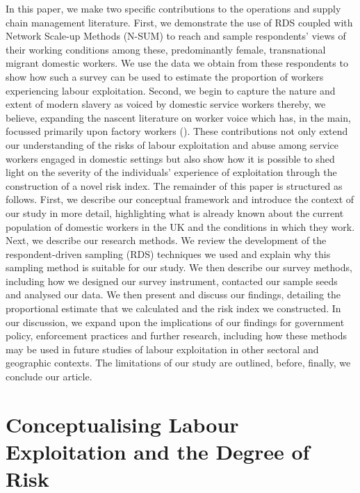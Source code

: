 \documentclass[
  12pt,
  letterpaper,
  DIV=11,
  numbers=noendperiod]{scrartcl}
\theoremstyle{plain}
\theoremstyle{definition}
\begin{document}
In this paper, we make two specific contributions to the operations and
supply chain management literature. First, we demonstrate the use of RDS
coupled with Network Scale-up Methods (N-SUM) to reach and sample
respondents' views of their working conditions among these,
predominantly female, transnational migrant domestic workers. We use the
data we obtain from these respondents to show how such a survey can be
used to estimate the proportion of workers experiencing labour
exploitation. Second, we begin to capture the nature and extent of
modern slavery as voiced by domestic service workers thereby, we
believe, expanding the nascent literature on worker voice which has, in
the main, focussed primarily upon factory workers
(\textcite{stephens_theorising_2024}). These contributions not only
extend our understanding of the risks of labour exploitation and abuse
among service workers engaged in domestic settings but also show how it
is possible to shed light on the severity of the individuals' experience
of exploitation through the construction of a novel risk index. The
remainder of this paper is structured as follows. First, we describe our
conceptual framework and introduce the context of our study in more
detail, highlighting what is already known about the current population
of domestic workers in the UK and the conditions in which they work.
Next, we describe our research methods. We review the development of the
respondent-driven sampling (RDS) techniques we used and explain why this
sampling method is suitable for our study. We then describe our survey
methods, including how we designed our survey instrument, contacted our
sample seeds and analysed our data. We then present and discuss our
findings, detailing the proportional estimate that we calculated and the
risk index we constructed. In our discussion, we expand upon the
implications of our findings for government policy, enforcement
practices and further research, including how these methods may be used
in future studies of labour exploitation in other sectoral and
geographic contexts. The limitations of our study are outlined, before,
finally, we conclude our article.

\section{Conceptualising Labour Exploitation and the Degree of
Risk}\label{conceptualising-labour-exploitation-and-the-degree-of-risk}
\end{document}
